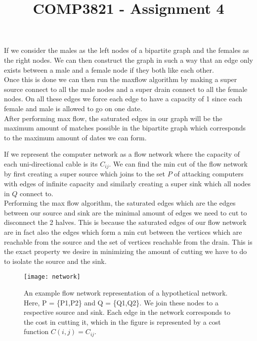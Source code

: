 \documentclass[12pt]{article}
\newenvironment{problem}[2][Problem]{\begin{trivlist}
\item[\hskip \labelsep {\bfseries #1}\hskip \labelsep {\bfseries #2.}]}{\end{trivlist}}
\begin{document}
 

\title{COMP3821 - Assignment 4} 
\rhead{\today}
 
\begin{problem}{1: Turn the problem into a bipartite graph and perform max matching} 
If we consider the males as the left nodes of a bipartite graph and the females as the right nodes. We can then construct the graph in such a way that an edge only exists between a male and a female node if they both like each other.\\

Once this is done we can then run the maxflow algorithm by making a super source connect to all the male nodes and a super drain connect to all the female nodes. On all these edges we force each edge to have a capacity of 1 since each female and male is allowed to go on one date.\\

After performing max flow, the saturated edges in our graph will be the maximum amount of matches possible in the bipartite graph which corresponds to the maximum amount of dates we can form.

\end{problem}

\begin{problem}{2: Find the min cut of the network where $c_{ij}$ s this the capacity}
If we represent the computer network as a flow network where the capacity of each uni-directional cable is its $C_{ij}$. We can find the min cut of the flow network by first creating a super source which joins to the set $P$ of attacking computers with edges of infinite capacity and similarly creating a super sink which all nodes in $Q$ connect to. \\


Performing the max flow algorithm, the saturated edges which are the edges between our source and sink are the minimal amount of edges we need to cut to disconnect the 2 halves. This is because the saturated edges of our flow network are in fact also the edges which form a min cut between the vertices which are reachable from the source and the set of vertices reachable from the drain. This is the exact property we desire in minimizing the amount of cutting we have to do to isolate the source and the sink.

\begin{figure}[H]
 \centering
  \texttt{[image: network]}
  \caption{An example flow network representation of a hypothetical network. Here, P = \{P1,P2\} and Q = \{Q1,Q2\}. We join these nodes to a respective source and sink. Each edge in the network corresponds to the cost in cutting it, which in the figure is represented by a cost function $C(i,j) = C_{ij}$.}
\end{figure}
\end{problem}
\end{document}
